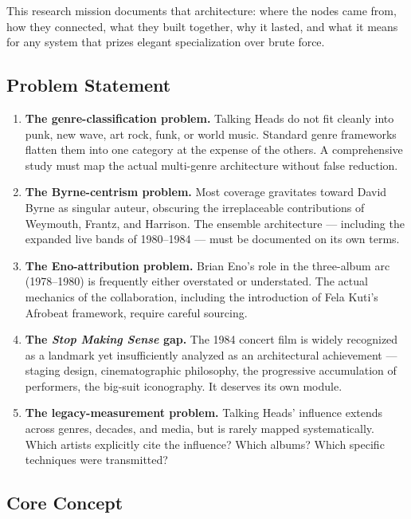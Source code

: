 \documentclass[11pt,letterpaper]{article}
\begin{document}
This research mission documents that architecture: where the nodes came from, how they connected, what they built together, why it lasted, and what it means for any system that prizes elegant specialization over brute force.

\subsection{Problem Statement}

\begin{enumerate}
  \item \textbf{The genre-classification problem.} Talking Heads do not fit cleanly into punk, new wave, art rock, funk, or world music. Standard genre frameworks flatten them into one category at the expense of the others. A comprehensive study must map the actual multi-genre architecture without false reduction.

  \item \textbf{The Byrne-centrism problem.} Most coverage gravitates toward David Byrne as singular auteur, obscuring the irreplaceable contributions of Weymouth, Frantz, and Harrison. The ensemble architecture --- including the expanded live bands of 1980--1984 --- must be documented on its own terms.

  \item \textbf{The Eno-attribution problem.} Brian Eno's role in the three-album arc (1978--1980) is frequently either overstated or understated. The actual mechanics of the collaboration, including the introduction of Fela Kuti's Afrobeat framework, require careful sourcing.

  \item \textbf{The \textit{Stop Making Sense} gap.} The 1984 concert film is widely recognized as a landmark yet insufficiently analyzed as an architectural achievement --- staging design, cinematographic philosophy, the progressive accumulation of performers, the big-suit iconography. It deserves its own module.

  \item \textbf{The legacy-measurement problem.} Talking Heads' influence extends across genres, decades, and media, but is rarely mapped systematically. Which artists explicitly cite the influence? Which albums? Which specific techniques were transmitted?
\end{enumerate}

\subsection{Core Concept}
\end{document}
